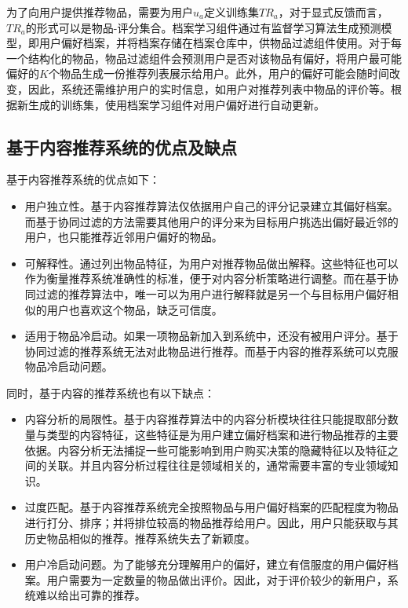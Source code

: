 为了向用户提供推荐物品，需要为用户$u_a$定义训练集$TR_a$，对于显式反馈而言，$TR_a$的形式可以是物品-评分集合。档案学习组件通过有监督学习算法生成预测模型，即用户偏好档案，并将档案存储在档案仓库中，供物品过滤组件使用。对于每一个结构化的物品，物品过滤组件会预测用户是否对该物品有偏好，将用户最可能偏好的$K$个物品生成一份推荐列表展示给用户。此外，用户的偏好可能会随时间改变，因此，系统还需维护用户的实时信息，如用户对推荐列表中物品的评价等。根据新生成的训练集，使用档案学习组件对用户偏好进行自动更新。

\subsection{基于内容推荐系统的优点及缺点}

基于内容推荐系统的优点如下：

\begin{itemize}
 \item 用户独立性。基于内容推荐算法仅依据用户自己的评分记录建立其偏好档案。而基于协同过滤的方法需要其他用户的评分来为目标用户挑选出偏好最近邻的用户，也只能推荐近邻用户偏好的物品。
 \item 可解释性。通过列出物品特征，为用户对推荐物品做出解释。这些特征也可以作为衡量推荐系统准确性的标准，便于对内容分析策略进行调整。而在基于协同过滤的推荐算法中，唯一可以为用户进行解释就是另一个与目标用户偏好相似的用户也喜欢这个物品，缺乏可信度。
 \item 适用于物品冷启动。如果一项物品新加入到系统中，还没有被用户评分。基于协同过滤的推荐系统无法对此物品进行推荐。而基于内容的推荐系统可以克服物品冷启动问题。
\end{itemize}

同时，基于内容的推荐系统也有以下缺点：

\begin{itemize}
	\item 内容分析的局限性。基于内容推荐算法中的内容分析模块往往只能提取部分数量与类型的内容特征，这些特征是为用户建立偏好档案和进行物品推荐的主要依据。内容分析无法捕捉一些可能影响到用户购买决策的隐藏特征以及特征之间的关联。并且内容分析过程往往是领域相关的，通常需要丰富的专业领域知识。
	\item 过度匹配。基于内容推荐系统完全按照物品与用户偏好档案的匹配程度为物品进行打分、排序；并将排位较高的物品推荐给用户。因此，用户只能获取与其历史物品相似的推荐。推荐系统失去了新颖度。
	\item 用户冷启动问题。为了能够充分理解用户的偏好，建立有信服度的用户偏好档案。用户需要为一定数量的物品做出评价。因此，对于评价较少的新用户，系统难以给出可靠的推荐。
\end{itemize}

